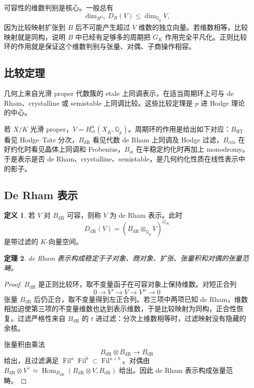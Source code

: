 \documentclass[11pt,a4paper,openany]{ctexbook}
\numberwithin{equation}{chapter}
\newcommand{\Q}{\mathbb{Q}}
\newcommand{\Fil}{\operatorname{Fil}}
\theoremstyle{plain}
\newtheorem{theorem}{定理}[chapter]
\theoremstyle{definition}
\newtheorem{definition}[theorem]{定义}
\theoremstyle{remark}
\begin{document}
可容性的维数判别是核心。一般总有
\[
  \dim_{B^{G_K}}D_B(V)\le \dim_{\Q_p}V,
\]
因为比较映射扩张到 $B$ 后不可能产生超过 $V$ 维数的独立向量。若维数相等，比较映射就是同构，说明 $B$ 中已经有足够多的周期把 $G_K$ 作用完全平凡化。正则比较环的作用就是保证这个维数判别与张量、对偶、子商操作相容。

\subsection{比较定理}

几何上来自光滑 proper 代数簇的 etale 上同调表示，在适当周期环上可与 de Rham、crystalline 或 semistable 上同调比较。这些比较定理是 $p$ 进 Hodge 理论的中心。

若 $X/K$ 光滑 proper，$V=H^n_{\mathrm{et}}(X_{\overline K},\Q_p)$。周期环的作用是给出如下对应：$B_{\mathrm{HT}}$ 看见 Hodge--Tate 分次，$B_{\mathrm{dR}}$ 看见代数 de Rham 上同调及 Hodge 过滤，$B_{\mathrm{cris}}$ 在好约化时看见晶体上同调和 Frobenius，$B_{\mathrm{st}}$ 在半稳定约化时再加上 monodromy。于是表示是否 de Rham、crystalline、semistable，是几何约化性质在线性表示中的影子。

\subsection{De Rham 表示}

\begin{definition}
若 $V$ 对 $B_{\mathrm{dR}}$ 可容，则称 $V$ 为 de Rham 表示。此时
\[
  D_{\mathrm{dR}}(V)=(B_{\mathrm{dR}}\otimes_{\Q_p}V)^{G_K}
\]
是带过滤的 $K$-向量空间。
\end{definition}

\begin{theorem}
de Rham 表示构成稳定于子对象、商对象、扩张、张量积和对偶的张量范畴。
\end{theorem}

\begin{proof}
$B_{\mathrm{dR}}$ 是正则比较环，取不变量函子在可容对象上保持维数。对短正合列
\[
  0\to V'\to V\to V''\to0
\]
张量 $B_{\mathrm{dR}}$ 后仍正合，取不变量得到左正合列。若三项中两项已知 de Rham，维数相加迫使第三项的不变量维数也达到表示维数，于是比较映射为同构，正合性恢复。过滤严格性来自 $B_{\mathrm{dR}}$ 的 $t$ 进过滤：分次上维数相等时，过滤映射没有隐藏的余核。

张量积由乘法
\[
  B_{\mathrm{dR}}\otimes B_{\mathrm{dR}}\to B_{\mathrm{dR}}
\]
给出，且过滤满足 $\Fil^a\Fil^b\subset\Fil^{a+b}$。对偶由 $B_{\mathrm{dR}}\otimes V^\vee\simeq\operatorname{Hom}_{B_{\mathrm{dR}}}(B_{\mathrm{dR}}\otimes V,B_{\mathrm{dR}})$ 给出。因此 de Rham 表示构成张量范畴。
\end{proof}
\end{document}
